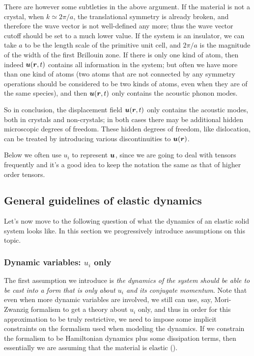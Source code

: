 \documentclass[hyperref, a4paper]{article}
\begin{document}
There are however some subtleties in the above argument.
If the material is not a crystal,
when $k \simeq 2\pi / a$,
the translational symmetry is already broken,
and therefore the wave vector is not well-defined any more;
thus the wave vector cutoff should be set to a much lower value.
If the system is an insulator, 
we can take $a$ to be the length scale of the primitive unit cell,
and $2\pi / a$ is the magnitude of the width of the first Brillouin zone.
If there is only one kind of atom,
then indeed $\vb*{u}(\vb*{r}, t)$ contains all information in the system;
but often we have more than one kind of atoms 
(two atoms that are not connected by any symmetry operations 
should be considered to be two kinds of atoms,
even when they are of the same species),
and then $\vb*{u}(\vb*{r}, t)$ only contains the acoustic phonon modes.

So in conclusion, 
the displacement field $\vb*{u}(\vb*{r}, t)$ only contains 
the acoustic modes,
both in crystals and non-crystals;
in both cases there may be additional hidden microscopic degrees of freedom.
These hidden degrees of freedom, 
like dislocation,
can be treated by introducing various discontinuities to $\vb*{u}(\vb*{r})$.

Below we often use $u_i$ to represent $\vb*{u}$, 
since we are going to deal with tensors frequently 
and it's a good idea to keep the notation the same
as that of higher order tensors.

\subsection{General guidelines of elastic dynamics}

Let's now move to the following question
of what the dynamics of an elastic solid system looks like.
In this section we progressively introduce assumptions on this topic.

\subsubsection{Dynamic variables: $u_i$ only}

The first assumption we introduce 
is \emph{the dynamics of the system should be able to be cast into a form that is only about 
$u_i$ and its conjugate momentum}. 
Note that even when more dynamic variables are involved, 
we still can use, say, Mori-Zwanzig formalism 
to get a theory about $u_i$ only,
and thus in order for this approximation 
to be truly restrictive, 
we need to impose some implicit constraints on 
the formalism used when modeling the dynamics.
If we constrain the formalism to be Hamiltonian dynamics 
plus some dissipation terms,
then essentially we are assuming that the material is elastic ().
\end{document}

